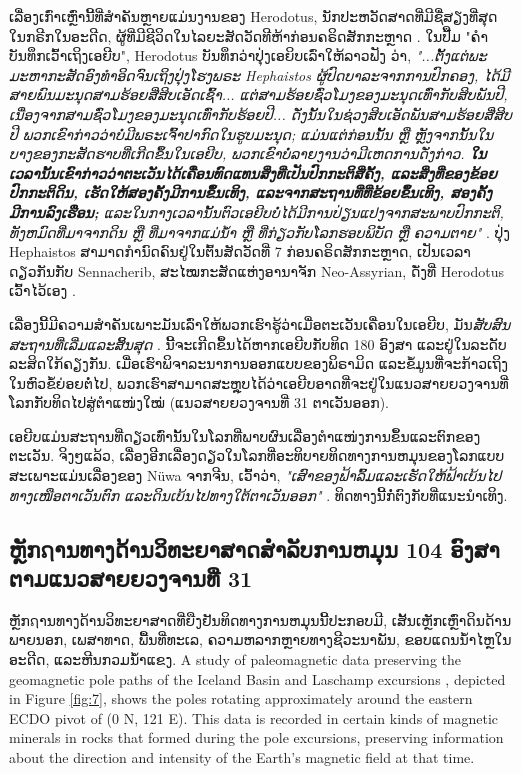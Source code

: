 \documentclass[10pt,twocolumn,letterpaper]{article}
\begin{document}
ເລື່ອງເກົ່າເຫຼົ່ານີ້ທີ່ສຳຄັນຫຼາຍແມ່ນງານຂອງ Herodotus, ນັກປະຫວັດສາດທີ່ມີຊື່ສຽງທີ່ສຸດໃນກຣີກໃນອະດີດ, ຜູ້ທີ່ມີຊີວິດໃນໄລຍະສັດວັດທີຫ້າກ່ອນຄຣິດສັກກະຫຼາດ \cite{31} . ໃນປື້ມ "ຄຳບັນທຶກເວົ້າເຖິງເອຍີບ", Herodotus ບັນທຶກວ່າປຸ່ງເອຍິບເລົ່າໃຫ້ລາວຟັງ ວ່າ, \textit{"...ຕັ້ງແຕ່ພະມະຫາກະສັດອົງທຳອິດຈົນເຖິງປຸ່ງໂຮງພຣະ Hephaistos ຜູ້ປົດບາລະຈາກການປົກຄອງ, ໄດ້ມີສາຍພົນມະນຸດສາມຮ້ອຍສີ່ສິບເອັດເຊົ້າ... ແຕ່ສາມຮ້ອຍຊົ່ວໂມງຂອງມະນຸດເທົ່າກັບສິບພັນປີ, ເນື່ອງຈາກສາມຊົ່ວໂມງຂອງມະນຸດເທົ່າກັບຮ້ອຍປີ... ດັ່ງນັ້ນໃນຊ່ວງສິບເອັດພັນສາມຮ້ອຍສີ່ສິບປີ ພວກເຂົາກ່າວວ່າບໍ່ມີພຣະເຈົ້າປາກົດໃນຮູບມະນຸດ; ແມ່ນແຕ່ກ່ອນນັ້ນ ຫຼື ຫຼັງຈາກນັ້ນໃນບາງຂອງກະສັດຮາບທີ່ເກີດຂຶ້ນໃນເອຍີບ, ພວກເຂົາບໍ່ລາຍງານວ່າມີເຫດການດັ່ງກ່າວ. \textbf{ໃນເວລານັ້ນເຂົາກ່າວວ່າຕະເວັນໄດ້ເຄື່ອນທົດແທນສິ່ງທີ່ເປັນປົກກະຕິສີ່ຄັ້ງ, ແລະສິ່ງທີ່ຂອງຂ້ອຍປົກກະຕິດິນ, ເຮັດໃຫ້ສອງຄັ້ງມີການຂຶ້ນເທິງ, ແລະຈາກສະຖານທີ່ທີ່ຂ້ອຍຂຶ້ນເທິງ, ສອງຄັ້ງມີການລົງເຮືອນ;} ແລະໃນກາງເວລານັ້ນຕົວເອຍີບບໍ່ໄດ້ມີການປ່ຽນແປງຈາກສະພາບປົກກະຕິ, ທັງຫມົດທີ່ມາຈາກດິນ ຫຼື ທີ່ມາຈາກແມ່ນ້ຳ ຫຼື ທີ່ກ່ຽວກັບໂລກຮອບພິບັດ ຫຼື ຄວາມຕາຍ"} \cite{32} . ປຸ່ງ Hephaistos ສາມາດກຳນົດຄົນຢູ່ໃນຕົ້ນສັດວັດທີ່ 7 ກ່ອນຄຣິດສັກກະຫຼາດ, ເປັນເວລາດຽວກັນກັບ Sennacherib, ສະໄໝກະສັດແຫ່ງອານາຈັກ Neo-Assyrian, ດັ່ງທີ່ Herodotus ເວົ້າໄວ້ເອງ \cite{32,33,34} .

ເລື່ອງນີ້ມີຄວາມສຳຄັນເພາະມັນເລົ່າໃຫ້ພວກເຮົາຮູ້ວ່າເມື່ອຕະເວັນເຄື່ອນໃນເອຍີບ, ມັນ\textit{ສັບສົນສະຖານທີ່ເລີ່ມແລະສິ້ນສຸດ} . ນີ້ຈະເກີດຂຶ້ນໄດ້ຫາກເອຍີບກັບທິດ 180 ອົງສາ ແລະຢູ່ໃນລະດັບລະສິດໃກ້ຄຽງກັນ. ເມື່ອເຮົາພິຈາລະນາການອອກແບບຂອງພິຣາມິດ ແລະຂໍ້ມູນທີ່ຈະກ້າວເຖິງໃນຫົວຂໍ້ຍ່ອຍຕໍ່ໄປ, ພວກເຮົາສາມາດສະຫຼຸບໄດ້ວ່າເອຍີບອາດທີ່ຈະຢູ່ໃນແນວສາຍຍວງຈານທີ່ໂລກກັບທິດໄປສູ່ຕຳແໜ່ງໃໝ່ (ແນວສາຍຍວງຈານທີ່ 31 ຕາເວັນອອກ).

ເອຍີບແມ່ນສະຖານທີ່ດຽວເທົ່ານັ້ນໃນໂລກທີ່ພາບຜົນເລື່ອງຕຳແໜ່ງການຂຶ້ນແລະຕົກຂອງຕະເວັນ. ຈິງໆແລ້ວ, ເລື່ອງອີກເລື່ອງດຽວໃນໂລກທີ່ອະທິບາຍທິດທາງການຫມຸນຂອງໂລກແບບສະເພາະແມ່ນເລື່ອງຂອງ Nüwa ຈາກຈີນ, ເວົ້າວ່າ, \textit{"ເສົາຂອງຟ້າລົ້ມແລະເຮັດໃຫ້ຟ້າເບ້ນໄປທາງເໜືອຕາເວັນຕົກ ແລະດິນເບ້ນໄປທາງໃຕ້ຕາເວັນອອກ"} \cite{8} . ທິດທາງນີ້ກໍ່ຕົງກັບທີ່ແນະນຳເທິງ.

\subsection{ຫຼັກຐານທາງດ້ານວິທະຍາສາດສຳລັບການຫມຸນ 104 ອົງສາຕາມແນວສາຍຍວງຈານທີ່ 31}

ຫຼັກຐານທາງດ້ານວິທະຍາສາດທີ່ຍືງຢັນທິດທາງການຫມຸນນີ້ປະກອບມີ, ເສັ້ນເຫຼັກເຫຼົ່າດິນດ້ານພາຍນອກ, ເພສາທາດ, ພື້ນທີ່ທະເລ, ຄວາມຫລາກຫຼາຍທາງຊີວະນາພັນ, ຂອບແດນນ້ຳໄຫຼໃນອະດີດ, ແລະຫີນກວມນ້ຳແຂງ.
A study of paleomagnetic data preserving the geomagnetic pole paths of the Iceland Basin and Laschamp excursions \cite{35}, depicted in Figure \ref{fig:7}, shows the poles rotating approximately around the eastern ECDO pivot of (0 N, 121 E). This data is recorded in certain kinds of magnetic minerals in rocks that formed during the pole excursions, preserving information about the direction and intensity of the Earth's magnetic field at that time.
\end{document}
